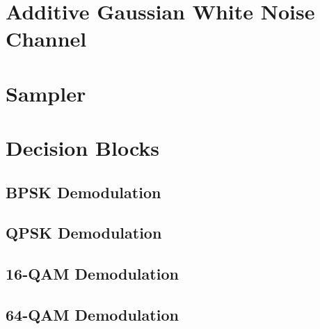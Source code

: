 \documentclass[]{article}
\begin{document}
\section{Additive Gaussian White Noise Channel}
\label{app:awgn_channel}


\newpage
\section{Sampler}
\label{app:sampler}



\section{Decision Blocks}
\label{app:dblocks}
\subsection{BPSK Demodulation}
\label{app:bpsk_demod}


\newpage
\subsection{QPSK Demodulation}
\label{app:qpsk_demod}


\subsection{16-QAM Demodulation}
\label{app:qam_16_demod}


\newpage
\subsection{64-QAM Demodulation}
\label{app:qam_64_demod}

\end{document}
